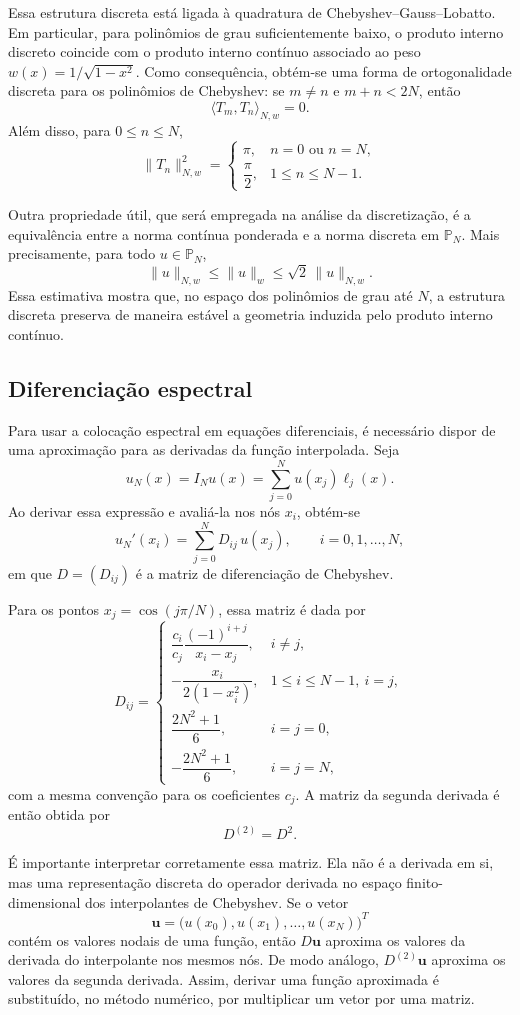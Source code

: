 Essa estrutura discreta está ligada à quadratura de Chebyshev--Gauss--Lobatto. Em particular, para polinômios de grau suficientemente baixo, o produto interno discreto coincide com o produto interno contínuo associado ao peso \(w(x)=1/\sqrt{1-x^2}\). Como consequência, obtém-se uma forma de ortogonalidade discreta para os polinômios de Chebyshev: se \(m\neq n\) e \(m+n<2N\), então
\[
\langle T_m,T_n\rangle_{N,w}=0.
\]
Além disso, para \(0\leq n\leq N\),
\[
\|T_n\|_{N,w}^2=
\begin{cases}
\pi, & n=0 \text{ ou } n=N,\\
\dfrac{\pi}{2}, & 1\leq n\leq N-1.
\end{cases}
\]

Outra propriedade útil, que será empregada na análise da discretização, é a equivalência entre a norma contínua ponderada e a norma discreta em \(\mathbb{P}_N\). Mais precisamente, para todo \(u\in\mathbb{P}_N\),
\[
\|u\|_{N,w}\leq \|u\|_{w}\leq \sqrt{2}\,\|u\|_{N,w}.
\]
Essa estimativa mostra que, no espaço dos polinômios de grau até \(N\), a estrutura discreta preserva de maneira estável a geometria induzida pelo produto interno contínuo.

\subsection{Diferenciação espectral}

Para usar a colocação espectral em equações diferenciais, é necessário dispor de uma aproximação para as derivadas da função interpolada. Seja
\[
u_N(x)=I_Nu(x)=\sum_{j=0}^{N}u(x_j)\ell_j(x).
\]
Ao derivar essa expressão e avaliá-la nos nós \(x_i\), obtém-se
\[
u_N'(x_i)=\sum_{j=0}^{N}D_{ij}\,u(x_j),
\qquad i=0,1,\dots,N,
\]
em que \(D=(D_{ij})\) é a matriz de diferenciação de Chebyshev.

Para os pontos \(x_j=\cos(j\pi/N)\), essa matriz é dada por
\[
D_{ij}=
\begin{cases}
\dfrac{c_i}{c_j}\dfrac{(-1)^{i+j}}{x_i-x_j}, & i\neq j,\\[1.2ex]
-\dfrac{x_i}{2(1-x_i^2)}, & 1\leq i\leq N-1,\ i=j,\\[1.2ex]
\dfrac{2N^2+1}{6}, & i=j=0,\\[1.2ex]
-\dfrac{2N^2+1}{6}, & i=j=N,
\end{cases}
\]
com a mesma convenção para os coeficientes \(c_j\). A matriz da segunda derivada é então obtida por
\[
D^{(2)}=D^2.
\]

É importante interpretar corretamente essa matriz. Ela não é a derivada em si, mas uma representação discreta do operador derivada no espaço finito-dimensional dos interpolantes de Chebyshev. Se o vetor
\[
\mathbf{u}=\big(u(x_0),u(x_1),\dots,u(x_N)\big)^T
\]
contém os valores nodais de uma função, então \(D\mathbf{u}\) aproxima os valores da derivada do interpolante nos mesmos nós. De modo análogo, \(D^{(2)}\mathbf{u}\) aproxima os valores da segunda derivada. Assim, derivar uma função aproximada é substituído, no método numérico, por multiplicar um vetor por uma matriz.

